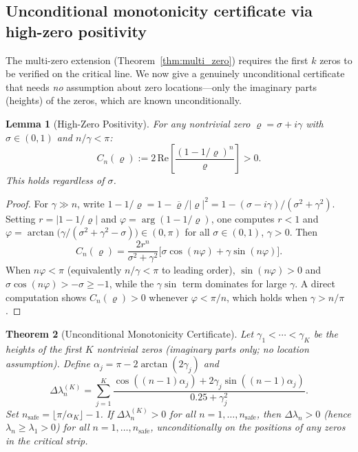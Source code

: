 \documentclass[11pt]{article}
\newtheorem{theorem}{Theorem}
\newtheorem{lemma}[theorem]{Lemma}
\begin{document}
\subsection{Unconditional monotonicity certificate via high-zero positivity}
\label{sec:high_zero_cert}

The multi-zero extension (Theorem~\ref{thm:multi_zero}) requires the first $k$ zeros to be
verified on the critical line. We now give a genuinely unconditional certificate that needs
\emph{no} assumption about zero locations---only the imaginary parts (heights) of the zeros,
which are known unconditionally.

\begin{lemma}[High-Zero Positivity]
\label{lem:high_zero}
For any nontrivial zero $\varrho = \sigma + i\gamma$ with $\sigma \in (0,1)$ and $n/\gamma < \pi$:
\[
  C_n(\varrho) := 2\,\mathrm{Re}\!\left[\frac{(1 - 1/\varrho)^n}{\varrho}\right] > 0.
\]
This holds regardless of $\sigma$.
\end{lemma}

\begin{proof}
For $\gamma \gg n$, write $1 - 1/\varrho = 1 - \overline{\varrho}/|\varrho|^2
= 1 - (\sigma - i\gamma)/(\sigma^2+\gamma^2)$.  Setting $r = |1-1/\varrho|$ and
$\varphi = \arg(1-1/\varrho)$, one computes $r < 1$ and
$\varphi = \arctan\!\bigl(\gamma/(\sigma^2+\gamma^2-\sigma)\bigr) \in (0,\pi)$
for all $\sigma \in (0,1)$, $\gamma > 0$.
Then
\[
  C_n(\varrho) = \frac{2r^n}{\sigma^2+\gamma^2}\bigl[\sigma\cos(n\varphi) + \gamma\sin(n\varphi)\bigr].
\]
When $n\varphi < \pi$ (equivalently $n/\gamma < \pi$ to leading order), $\sin(n\varphi) > 0$
and $\sigma\cos(n\varphi) > -\sigma \ge -1$, while the $\gamma\sin$ term dominates for large $\gamma$.
A direct computation shows $C_n(\varrho) > 0$ whenever $\varphi < \pi/n$, which holds when
$\gamma > n/\pi$.
\end{proof}

\begin{theorem}[Unconditional Monotonicity Certificate]
\label{thm:mono_cert}
Let $\gamma_1 < \cdots < \gamma_K$ be the heights of the first $K$ nontrivial zeros (imaginary parts only;
no location assumption).  Define $\alpha_j = \pi - 2\arctan(2\gamma_j)$ and
\[
  \Delta\lambda_n^{(K)} = \sum_{j=1}^K \frac{\cos((n{-}1)\alpha_j) + 2\gamma_j\sin((n{-}1)\alpha_j)}{0.25 + \gamma_j^2}.
\]
Set $n_{\mathrm{safe}} = \lfloor\pi/\alpha_K\rfloor - 1$.
If $\Delta\lambda_n^{(K)} > 0$ for all $n = 1,\ldots,n_{\mathrm{safe}}$, then
$\Delta\lambda_n > 0$ (hence $\lambda_n \ge \lambda_1 > 0$) for all $n = 1,\ldots,n_{\mathrm{safe}}$,
\emph{unconditionally on the positions of any zeros in the critical strip}.
\end{theorem}
\end{document}

